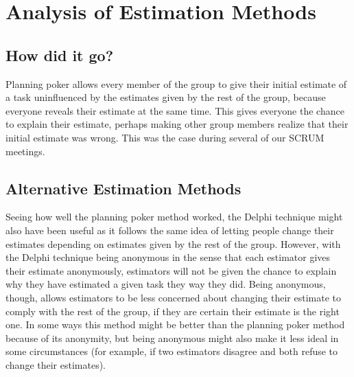 \section{Analysis of Estimation Methods}
\subsection{How did it go?}
Planning poker allows every member of the group to give their initial estimate of a task uninfluenced by the estimates given by the rest of the group, because everyone reveals their estimate at the same time. This gives everyone the chance to explain their estimate, perhaps making other group members realize that their initial estimate was wrong. This was the case during several of our SCRUM meetings.

\subsection{Alternative Estimation Methods}
Seeing how well the planning poker method worked, the Delphi technique might also have been useful as it follows the same idea of letting people change their estimates depending on estimates given by the rest of the group. However, with the Delphi technique being anonymous in the sense that each estimator gives their estimate anonymously, estimators will not be given the chance to explain why they have estimated a given task they way they did. Being anonymous, though, allows estimators to be less concerned about changing their estimate to comply with the rest of the group, if they are certain their estimate is the right one. In some ways this method might be better than the planning poker method because of its anonymity, but being anonymous might also make it less ideal in some circumstances (for example, if two estimators disagree and both refuse to change their estimates).

